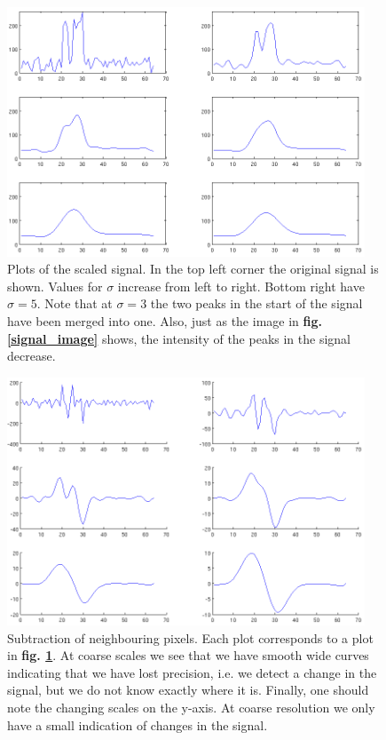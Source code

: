 \documentclass[a4paper, 10pt, final]{article}
\begin{document}
\begin{figure}[!h]
    \centering
    \includegraphics[angle=0,width=0.95\textwidth]{images/scale_signal}
    \caption{Plots of the scaled signal. In the top left corner the
    original signal is shown. Values for $\sigma$ increase from left to
    right. Bottom right have $\sigma = 5$. Note that at $\sigma = 3$ the
    two peaks in the start of the signal have been merged into one.
    Also, just as the image in \textbf{fig. \ref{signal_image}} shows,
    the intensity of the peaks in the signal decrease.}
    \label{signal_plots}
\end{figure}

\begin{figure}[!h]
    \centering
    \includegraphics[angle=0,width=0.95\textwidth]{images/scale_zero_cross}
    \caption{Subtraction of neighbouring pixels.
    Each plot corresponds to a plot in \textbf{fig. \ref{signal_plots}}.
    At coarse scales we see that we have smooth wide curves indicating
    that we have lost precision, i.e. we detect a change in the signal,
    but we do not know exactly where it is. Finally, one should note the
    changing scales on the y-axis. At coarse resolution we only have a
    small indication of changes in the signal.}
    \label{edges_plots}
\end{figure}




\end{document}
